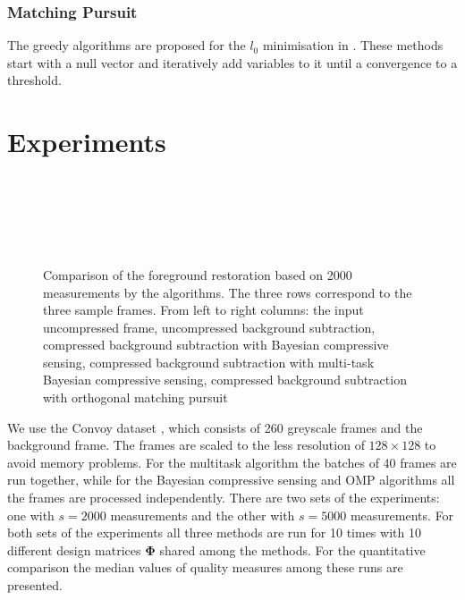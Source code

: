 \documentclass[conference]{IEEEtran}
\begin{document}
\subsubsection{Matching Pursuit}
The greedy algorithms are proposed for the $l_0$ minimisation in \cite{Mallat93}. These methods start with a null vector and iteratively add variables to it until a convergence to a threshold.

\section{Experiments}
\label{sec:experiments}
\begin{figure*}[!t]
\centering
{}
~
~
~
\subfloat[]{\texttt{[image: mt\_40\_2000]}}
~

~
~
~
\subfloat[]{\texttt{[image: mt\_99\_2000]}}
~

~
~
~
\subfloat[]{\texttt{[image: mt\_203\_2000]}}
~
\caption{Comparison of the foreground restoration based on 2000 measurements by the algorithms. The three rows correspond to the three sample frames. From left to right columns: the input uncompressed frame, uncompressed background subtraction, compressed background subtraction with Bayesian compressive sensing, compressed background subtraction with multi-task Bayesian compressive sensing, compressed background subtraction with orthogonal matching pursuit}
\label{fig:results2000}
\end{figure*}


We use the Convoy dataset \cite{Warnell2014}, which consists of 260 greyscale frames and the background frame. The frames are scaled to the less resolution of $128 \times 128$ to avoid memory problems. For the multitask algorithm the batches of 40 frames are run together, while for the Bayesian compressive sensing and OMP algorithms all the frames are processed independently. There are two sets of the experiments: one with $s = 2000$ measurements and the other with $s = 5000$ measurements. For both sets of the experiments all three methods are run for 10 times with 10 different design matrices $\mathbf{\Phi}$ shared among the methods. For the quantitative comparison the median values of quality measures among these runs are presented.
\end{document}

